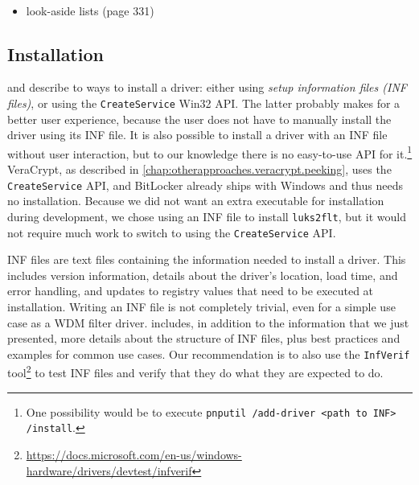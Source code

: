 \\

\begin{itemize}
	\item look-aside lists (page 331)
\end{itemize}

\subsection{Installation}
\label{chap:ourapproach.final.install}
\cite{Yosifovich2017} and \cite{Wdk} describe to ways to install a driver: either using \emph{setup information files (INF files)}, or using the \texttt{CreateService} Win32 API. The latter probably makes for a better user experience, because the user does not have to manually install the driver using its INF file. It is also possible to install a driver with an INF file without user interaction, but to our knowledge there is no easy-to-use API for it.\footnote{\label{fn:ourapproach.final.automaticinfinstall} One possibility would be to execute \texttt{pnputil /add-driver <path to INF> /install}.} VeraCrypt, as described in \autoref{chap:otherapproaches.veracrypt.peeking}, uses the \texttt{CreateService} API, and BitLocker already ships with Windows and thus needs no installation. Because we did not want an extra executable for installation during development, we chose using an INF file to install \texttt{luks2flt}, but it would not require much work to switch to using the \texttt{CreateService} API.

INF files are text files containing the information needed to install a driver. This includes version information, details about the driver's location, load time, and error handling, and updates to registry values that need to be executed at installation. Writing an INF file is not completely trivial, even for a simple use case as a WDM filter driver. \cite{Wdk} includes, in addition to the information that we just presented, more details about the structure of INF files, plus best practices and examples for common use cases. Our recommendation is to also use the \texttt{InfVerif} tool\footnote{\label{fn:ourapproach.final.infverif} \url{https://docs.microsoft.com/en-us/windows-hardware/drivers/devtest/infverif}} to test INF files and verify that they do what they are expected to do.

